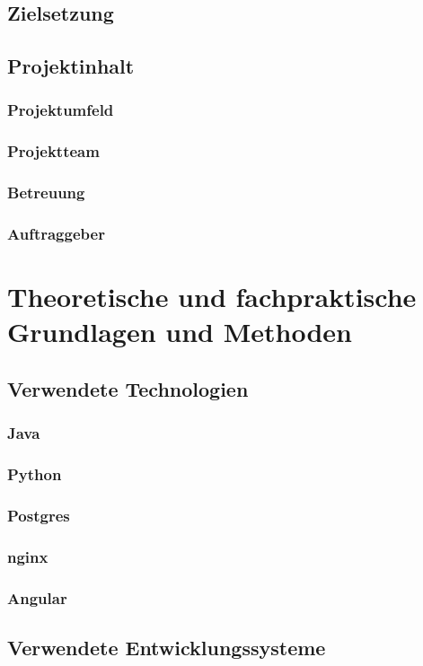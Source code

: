 \documentclass{report}
\begin{document}
\section{Zielsetzung}
\section{Projektinhalt}
\subsection{Projektumfeld}
\subsection{Projektteam}
\subsection{Betreuung}
\subsection{Auftraggeber}

\chapter{Theoretische und fachpraktische Grundlagen und Methoden}
\section{Verwendete Technologien}
\subsection{Java}
\subsection{Python}
\subsection{Postgres}
\subsection{nginx}
\subsection{Angular}
\section{Verwendete Entwicklungssysteme}
\end{document}

